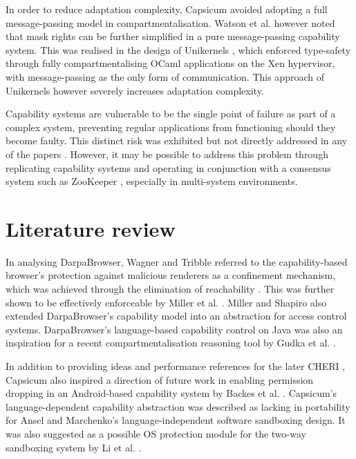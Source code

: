 \documentclass[11pt]{article}
\begin{document}
In order to reduce adaptation complexity, Capsicum \cite{watson2010capsicum} avoided adopting a full message-passing model in compartmentalisation. Watson et al. however noted that mask rights can be further simplified in a pure message-passing capability system. This was realised in the design of Unikernels \cite{madhavapeddy2013unikernels}, which enforced type-safety through fully compartmentalising OCaml applications on the Xen hypervisor, with message-passing as the only form of communication. This approach of Unikernels however severely increases adaptation complexity.

Capability systems are vulnerable to be the single point of failure as part of a complex system, preventing regular applications from functioning should they become faulty. This distinct risk was exhibited but not directly addressed in any of the papers \cite[Sec. 4.2]{wagner2002security} \cite[5.5]{watson2010capsicum} \cite[III. B.]{watson2015cheri}. However, it may be possible to address this problem through replicating capability systems and operating in conjunction with a consensus system such as ZooKeeper \cite{hunt2010zookeeper}, especially in multi-system environments.

\section{Literature review}

In analysing DarpaBrowser, Wagner and Tribble \cite[2.1]{wagner2002security} referred to the capability-based browser's protection against malicious renderers as a confinement mechanism, which was achieved through the elimination of reachability \cite[4.1]{wagner2002security}. This was further shown to be effectively enforceable by Miller et al. \cite{miller2003capability}. Miller and Shapiro \cite{miller2003paradigm} also extended DarpaBrowser's capability model into an abstraction for access control systems. DarpaBrowser's language-based capability control on Java was also an inspiration for a recent compartmentalisation reasoning tool by Gudka et al. \cite{gudka2015clean}.

In addition to providing ideas and performance references for the later CHERI \cite{woodruff2014cheri, watson2015cheri}, Capsicum also inspired a direction of future work in enabling permission dropping in an Android-based capability system by Backes et al. \cite{backes2015boxify}. Capsicum's language-dependent capability abstraction was described as lacking in portability for Ansel and Marchenko's \cite{ansel2011language} language-independent software sandboxing design. It was also suggested as a possible OS protection module for the two-way sandboxing system by Li et al. \cite{li2014minibox}.
\end{document}
